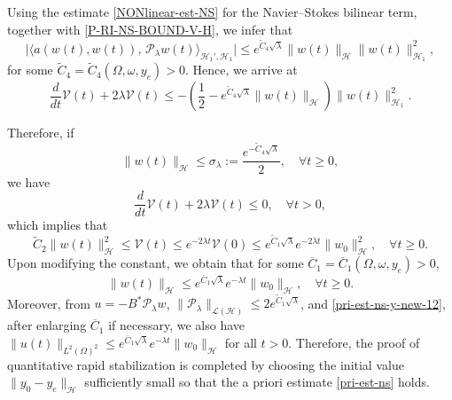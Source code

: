 \documentclass[a4paper]{article}
\numberwithin{equation}{section}
\begin{document}
Using the estimate \eqref{NONlinear-est-NS} for the Navier--Stokes bilinear term, together with \eqref{P-RI-NS-BOUND-V-H}, we infer that
$$\bigl|\langle a(w(t),w(t)),\,\mathcal P_\lambda w(t)\rangle_{\mathcal H_1',\mathcal H_1}\bigr|\le e^{\widetilde C_4\sqrt{\lambda}}\|w(t)\|_{\mathcal H}\|w(t)\|_{\mathcal H_1}^2,$$
for some $\widetilde C_4=\widetilde C_4(\Omega,\omega,y_e)>0$. Hence, we arrive at
$$\frac{d}{dt}\mathcal V(t)+2\lambda \mathcal V(t)\le-\left(\frac12-e^{\widetilde C_4\sqrt{\lambda}}\|w(t)\|_{\mathcal H}\right)\|w(t)\|_{\mathcal H_1}^2.$$

Therefore, if 
\begin{equation}
\label{pri-est-ns} 
\|w(t)\|_{\mathcal H}\le \sigma_\lambda:=\frac {e^{-\widetilde C_4\sqrt{\lambda}}}2,\quad\forall t\ge 0,	
\end{equation}
we have	
$$\frac{d}{dt}\mathcal V(t)+2\lambda \mathcal V(t)\le0,\quad\forall t> 0,$$
which implies that
\begin{equation*}
\tilde{C}_2\|w(t)\|_{\mathcal H}^2\le \mathcal V(t)\le e^{ {-2\lambda t} }  \mathcal V(0)\le e^{\tilde{C}_1\sqrt{\lambda}}e^{{-2\lambda t}} \|w_0\|_{\mathcal H}^2,\quad\forall t\ge 0.
\end{equation*}
Upon modifying the constant, we obtain that for some $\overline{C}_1=\overline{C}_1(\Omega,\omega,y_e)>0$,
\begin{equation}
\label{pri-est-ns-y-new-12} 
\|w(t)\|_{\mathcal H}\le e^{\overline{C}_1\sqrt{\lambda}}e^{{-\lambda t}} \|w_0\|_{\mathcal H},\quad\forall t\ge 0.
\end{equation}
Moreover, from $u=-B^*\mathcal P_\lambda w$, $\|\mathcal P_\lambda\|_{\mathcal L(\mathcal H)}\le 2e^{\tilde C_1\sqrt{\lambda}}$, and \eqref{pri-est-ns-y-new-12}, after enlarging $\overline C_1$ if necessary, we also have $\|u(t)\|_{L^2(\Omega)^2}\le e^{\overline C_1\sqrt{\lambda}}e^{-\lambda t}\|w_0\|_{\mathcal H}$ for all $t>0$.
Therefore, the proof of quantitative rapid stabilization is completed by choosing the initial value $\|y_0-y_e\|_{\mathcal H}$ sufficiently small so that the a priori estimate \eqref{pri-est-ns} holds.  
\end{document}
